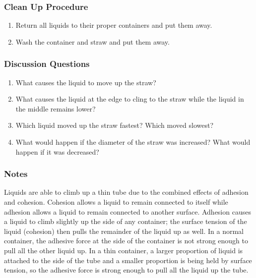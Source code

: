 \subsubsection*{Clean Up Procedure}
\begin{enumerate}
\item{Return all liquids to their proper containers and put them away.} 
\item{Wash the container and straw and put them away.} 
\end{enumerate}

\subsubsection*{Discussion Questions}
\begin{enumerate}
\item{What causes the liquid to move up the straw?}
\item{What causes the liquid at the edge to cling to the straw while the liquid in the middle remains lower?}
\item{Which liquid moved up the straw fastest? Which moved slowest?}
\item{What would happen if the diameter of the straw was increased? What would happen if it was decreased?}
\end{enumerate}

\subsubsection*{Notes}
Liquids are able to climb up a thin tube due to the combined effects of adhesion and cohesion. Cohesion allows a liquid to remain connected to itself while adhesion allows a liquid to remain connected to another surface. Adhesion causes a liquid to climb slightly up the side of any container; the surface tension of the liquid (cohesion) then pulls the remainder of the liquid up as well. In a normal container, the adhesive force at the side of the container is not strong enough to pull all the other liquid up. In a thin container, a larger proportion of liquid is attached to the side of the tube and a smaller proportion is being held by surface tension, so the adhesive force is strong enough to pull all the liquid up the tube.
